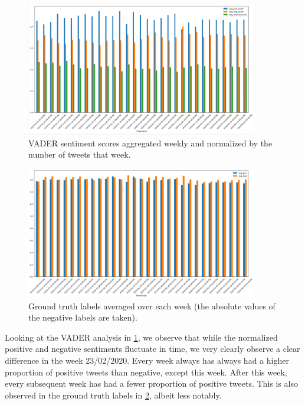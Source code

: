 \begin{figure}
    \centering
    \includegraphics[width=0.9\textwidth]{images/p3_fig9.png}
    \caption{VADER sentiment scores aggregated weekly and normalized by the number of tweets that week.}
    \label{fig:p3-fig9}
\end{figure}
\begin{figure}
    \centering
    \includegraphics[width=0.9\textwidth]{images/p3_fig10.png}
    \caption{Ground truth labels averaged over each week (the absolute values of the negative labels are taken).}
    \label{fig:p3-fig10}
\end{figure}

Looking at the VADER analysis in \cref{fig:p3-fig9}, we observe that while the normalized positive and negative sentiments fluctuate in time, we very clearly observe a clear difference in the week 23/02/2020. Every week always has always had a higher proportion of positive tweets than negative, except this week. After this week, every subsequent week has had a fewer proportion of positive tweets. This is also observed in the ground truth labels in \cref{fig:p3-fig10}, albeit less notably.

